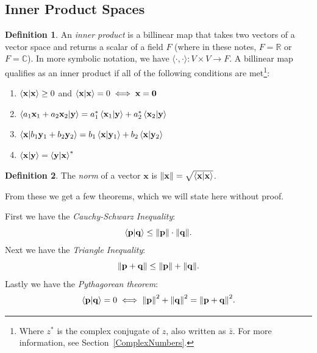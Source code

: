\documentclass[10pt]{scrartcl}
\numberwithin{equation}{subsection}
\theoremstyle{definition}
\newtheorem{definition}{Definition}[section]
\theoremstyle{remark}
\newenvironment{definitionSR}
	{
		\begin{siderules}
			\begin{definition}
			}
			{
			\end{definition}
		\end{siderules}
	}
\newcommand{\Reals}{\mathbb{R}}
\newcommand{\Complex}{\mathbb{C}}
\newcommand{\ve}[1]{
		\mathbf{#1}
	}
\begin{document}
\subsection{Inner Product Spaces}

\begin{definitionSR}
	An \textit{inner product} is a billinear map that takes two vectors of a vector
	space and returns a scalar of a field $F$ (where in these notes, $F=\Reals$ or
	$F=\Complex$).
	In more symbolic notation, we have $\langle \cdot , \cdot \rangle : V \times V
	\to F$. A billinear map qualifies as an inner product if all of the following
	conditions are
	met\footnote{Where $z^*$ is the complex conjugate of $z$, also written as
	$\bar{z}$. For more information, see Section~\ref{ComplexNumbers}.}:
	\begin{enumerate}
		\item $\braket{\ve{x}}{\ve{x}} \geq 0$ and $\braket{\ve{x}}{\ve{x}} = 0 \iff \ve{x} = \ve{0}$
		\item $\braket{a_1\ve{x}_1 + a_2\ve{x}_2}{\ve{y}} = a_1^*\braket{\ve{x}_1}{\ve{y}} + a_2^*\braket{\ve{x}_2}{\ve{y}}$
		\item $\braket{\ve{x}}{b_1\ve{y}_1 + b_2\ve{y}_2} = b_1\braket{\ve{x}}{\ve{y}_1} + b_2\braket{\ve{x}}{\ve{y}_2}$
		\item $\braket{\ve{x}}{\ve{y}} = \braket{\ve{y}}{\ve{x}}^*$
	\end{enumerate}

\end{definitionSR}
\begin{definitionSR}
	The \textit{norm} of a vector $\ve{x}$ is $\norm{\ve{x}} = \sqrt{\braket{\ve{x}}{\ve{x}}}$.
\end{definitionSR}

From these we get a few theorems, which we will state here without proof.

First we have the \textit{Cauchy-Schwarz Inequality}:
\begin{equation}
	\braket{\ve{p}}{\ve{q}} \leq \norm{\ve{p}}\cdot\norm{\ve{q}}.
\end{equation}
Next we have the \textit{Triangle Inequality}:
\begin{equation}
	\norm{\ve{p} + \ve{q}} \leq \norm{\ve{p}} + \norm{\ve{q}}.
\end{equation}
Lastly we have the \textit{Pythagorean theorem}:
\begin{equation}
	\braket{\ve{p}}{\ve{q}} = 0 \iff \norm{\ve{p}}^2 + \norm{\ve{q}}^2 =
	\norm{\ve{p} + \ve{q}}^2.
\end{equation}
\end{document}
